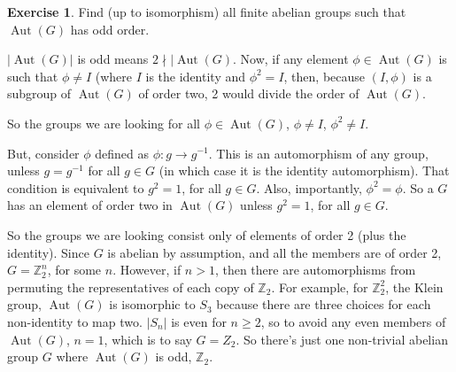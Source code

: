 \documentclass[11pt,oneside]{article}
\numberwithin{equation}{section}
\theoremstyle{definition}
\newtheorem{exercise}{Exercise}
\def\ZZ{\mathbb{Z}}
\def\Aut{\operatorname{Aut}}
\begin{document}
\begin{exercise}
  Find (up to isomorphism) all finite abelian groups such that
  $\Aut(G)$ has odd order.  
\end{exercise}
\begin{solution}
  $|\Aut(G)|$ is odd means $2 \nmid | \Aut(G)$.  Now, if any element $\phi \in \Aut(G)$ is
  such that $\phi \neq I$ (where $I$ is the identity and $\phi^2 = I$, then,
  because $(I, \phi)$ is a subgroup of $\Aut(G)$ of order two, 2 would divide
  the order of $\Aut(G)$.

  So the groups we are looking for all $\phi \in \Aut(G)$, $\phi \neq I$, $\phi ^2 \neq I$.

  But, consider $\phi$ defined as $\phi : g \to g^{-1}$.  This is an automorphism
  of any group, unless $ g = g ^ {-1}$ for all $g \in G$ (in which case it is
  the identity automorphism).  That condition is equivalent to $g^2 = 1$, for all
  $g \in G$.  Also, importantly, $ \phi ^2 = \phi$.  So a $G$ has an element
  of order two in $\Aut(G)$ unless $g ^2 =1 $, for all $g \in G$.

  So the groups we are looking consist only of elements of order 2 (plus the
  identity).  Since $G$ is abelian by assumption, and all the members are of order
  2, $G = \ZZ_2 ^ n$, for some $n$.  However, if $n >1$, then there are automorphisms
  from permuting the representatives of each copy of $\ZZ_2$.  For example, for $\ZZ_2^2$,
  the Klein group, $\Aut(G)$ is isomorphic to $S_3$ because there are three choices
  for each non-identity to map two.  $|S_n|$ is even for $n \geq 2$, so to avoid
  any even members of $\Aut(G)$, $n = 1$, which is to say $G = Z_2$.  So there's
  just one non-trivial abelian group $G$ where $\Aut(G)$ is odd, $\ZZ_2$.  
  
\end{solution}

\begin{comment}
  \begin{exercise}
    problem
  \end{exercise}
  \begin{solution}
    \begin{enumerate}[(a)]
    \item
      first answer
    \end{enumerate}
  \end{solution}
\end{comment}
\end{document}
